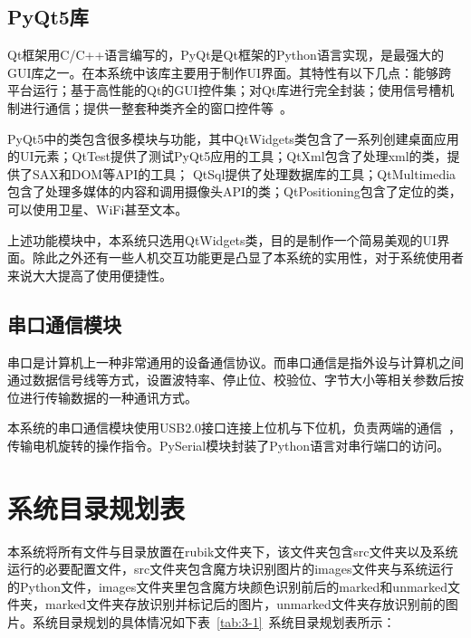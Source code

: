 \subsection{PyQt5库}

Qt框架用C/C++语言编写的，PyQt是Qt框架的Python语言实现，是最强大的GUI库之一。在本系统中该库主要用于制作UI界面。其特性有以下几点：能够跨平台运行；基于高性能的Qt的GUI控件集；对Qt库进行完全封装；使用信号槽机制进行通信；提供一整套种类齐全的窗口控件等~\cite{28}。

PyQt5中的类包含很多模块与功能，其中QtWidgets类包含了一系列创建桌面应用的UI元素；QtTest提供了测试PyQt5应用的工具；QtXml包含了处理xml的类，提供了SAX和DOM等API的工具； QtSql提供了处理数据库的工具；QtMultimedia包含了处理多媒体的内容和调用摄像头API的类；QtPositioning包含了定位的类，可以使用卫星、WiFi甚至文本。

上述功能模块中，本系统只选用QtWidgets类，目的是制作一个简易美观的UI界面。除此之外还有一些人机交互功能更是凸显了本系统的实用性，对于系统使用者来说大大提高了使用便捷性。

\subsection{串口通信模块}

串口是计算机上一种非常通用的设备通信协议。而串口通信是指外设与计算机之间通过数据信号线等方式，设置波特率、停止位、校验位、字节大小等相关参数后按位进行传输数据的一种通讯方式。

本系统的串口通信模块使用USB2.0接口连接上位机与下位机，负责两端的通信~\cite{29}，传输电机旋转的操作指令。PySerial模块封装了Python语言对串行端口的访问。

\section{系统目录规划表}

本系统将所有文件与目录放置在rubik文件夹下，该文件夹包含src文件夹以及系统运行的必要配置文件，src文件夹包含魔方块识别图片的images文件夹与系统运行的Python文件，images文件夹里包含魔方块颜色识别前后的marked和unmarked文件夹，marked文件夹存放识别并标记后的图片，unmarked文件夹存放识别前的图片。系统目录规划的具体情况如下表~\ref{tab:3-1}~系统目录规划表所示：

